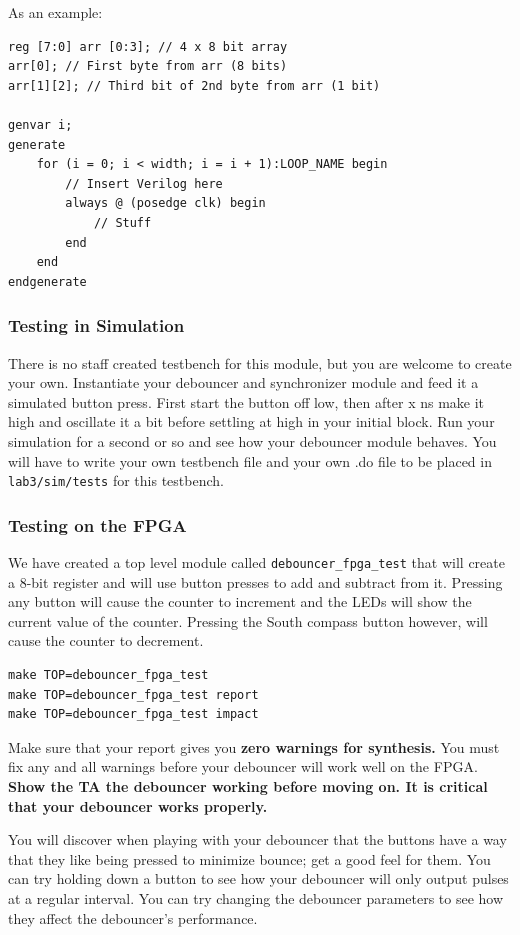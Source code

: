 \documentclass[11pt]{article}
\begin{document}
As an example:

\begin{verbatim}
reg [7:0] arr [0:3]; // 4 x 8 bit array
arr[0]; // First byte from arr (8 bits)
arr[1][2]; // Third bit of 2nd byte from arr (1 bit)

genvar i;
generate
	for (i = 0; i < width; i = i + 1):LOOP_NAME begin
		// Insert Verilog here
		always @ (posedge clk) begin
			// Stuff
		end
	end
endgenerate
\end{verbatim}

\subsubsection{Testing in Simulation}
There is no staff created testbench for this module, but you are welcome to create your own. Instantiate your debouncer and synchronizer module and feed it a simulated button press. First start the button off low, then after x ns make it high and oscillate it a bit before settling at high in your initial block. Run your simulation for a second or so and see how your debouncer module behaves. You will have to write your own testbench file and your own .do file to be placed in \verb|lab3/sim/tests| for this testbench.

\subsubsection{Testing on the FPGA}
We have created a top level module called \verb|debouncer_fpga_test| that will create a 8-bit register and will use button presses to add and subtract from it. Pressing any button will cause the counter to increment and the LEDs will show the current value of the counter. Pressing the South compass button however, will cause the counter to decrement. 

\begin{verbatim}
make TOP=debouncer_fpga_test
make TOP=debouncer_fpga_test report
make TOP=debouncer_fpga_test impact
\end{verbatim} 

Make sure that your report gives you \textbf{zero warnings for synthesis.} You must fix any and all warnings before your debouncer will work well on the FPGA.\\

\textbf{Show the TA the debouncer working before moving on. It is critical that your debouncer works properly.}

You will discover when playing with your debouncer that the buttons have a way that they like being pressed to minimize bounce; get a good feel for them. You can try holding down a button to see how your debouncer will only output pulses at a regular interval. You can try changing the debouncer parameters to see how they affect the debouncer's performance.
\end{document}
